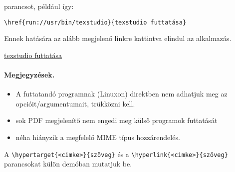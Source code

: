 \documentclass{article}
\begin{document}
parancsot, például így:

\verb!\href{run://usr/bin/texstudio}{texstudio futtatása}!

Ennek hatására az alább megjelenő linkre kattintva elindul az alkalmazás.

\begin{center}
\href{run: /usr/bin/texstudio}{texstudio futtatása}
\end{center}
\paragraph{Megjegyzések.} 
\begin{itemize}
	\item A futtatandó programnak (Linuxon) direktben nem adhatjuk meg az opcióit/argumentumait, trükközni kell.
	\item sok PDF megjelenítő nem engedi meg külső programok futtatását
	\item néha hiányzik a megfelelő MIME típus hozzárendelés.
\end{itemize}
A \verb!\hypertarget{<cimke>}{szöveg}! és a  \verb!\hyperlink{<cimke>}{szöveg}! parancsokat külön demóban mutatjuk be.
\end{document}
